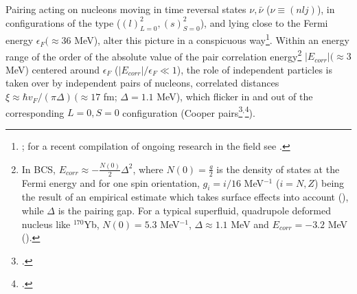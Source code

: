 Pairing acting on nucleons moving in time reversal states $\nu,\bar\nu$ ($\nu\equiv(nlj)$), in configurations of the type ($(l)^2_{L=0},(s)^2_{S=0}$), and lying close to the Fermi energy $\epsilon_F(\approx 36$ MeV), alter this picture in a conspicuous way\footnote{\cite{Bohr:58}; for a recent compilation of ongoing research in the field see \cite{Broglia:13}.}. Within an energy range of the order of the absolute value of the pair correlation energy\footnote{In BCS, $E_{corr}\approx-\frac{N(0)}{2}\Delta^2$, where $N(0)=\frac{g}{2}$ is the density of states at the Fermi energy and for one spin orientation, $g_i=i/16$ MeV$^{-1}$ ($i=N,Z$) being the result of an empirical estimate which takes surface effects into account (\cite{Bohr:75,Bortignon:98}), while $\Delta$ is the pairing gap. For a typical superfluid, quadrupole deformed nucleus like $^{170}$Yb, $N(0)=5.3$ MeV$^{-1}$, $\Delta\approx1.1$ MeV and $E_{corr}=-3.2$ MeV (\cite{Shimizu:89}).} $|E_{corr}|(\approx 3 $MeV) centered around $\epsilon_F$ ($|E_{corr}|/\epsilon_F\ll1$), the role of independent particles is taken over by independent pairs of nucleons, correlated distances $\xi\approx\hbar v_F/(\pi\Delta)\,(\approx 17$ fm; $\Delta=1.1$ MeV), which flicker in and out of the corresponding $L=0, S=0$ configuration (Cooper pairs\footnote{\cite{Cooper:56}.}$^{,}$\footnote{\cite{Brink:05}.}).


